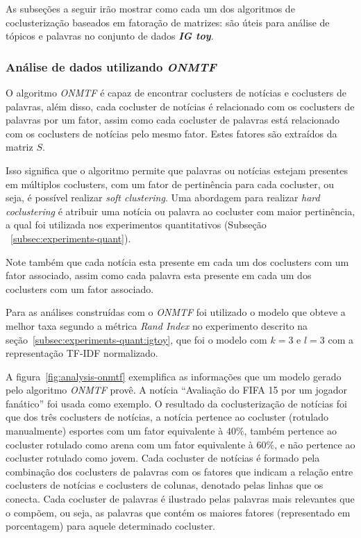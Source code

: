 \documentclass[
    12pt,                %
    oneside,            %
    a4paper,            %
    english,            %
    brazil                %
    ]{abntex2ppgsi}
\begin{document}
As subseções a seguir irão mostrar como cada um dos algoritmos de coclusterização baseados em fatoração de matrizes:
são úteis para análise de tópicos e palavras no conjunto de dados \textit{\textbf{IG toy}}.

\subsubsection{Análise de dados utilizando \textit{ONMTF}}

O algoritmo \textit{ONMTF} é capaz de encontrar coclusters de notícias e coclusters de palavras, além disso, cada cocluster de notícias é relacionado com os coclusters de palavras por um fator, assim como cada cocluster de palavras está relacionado com os coclusters de notícias pelo mesmo fator.
Estes fatores são extraídos da matriz $S$.

Isso significa que o algoritmo permite que palavras ou notícias estejam presentes em múltiplos coclusters, com um fator de pertinência para cada cocluster, ou seja, é possível realizar \textit{soft clustering}.\tabularnewline
Uma abordagem para realizar \textit{hard coclustering} é atribuir uma notícia ou palavra ao cocluster com maior pertinência, a qual foi utilizada nos experimentos quantitativos (Subseção ~\ref{subsec:experiments-quant}).

Note também que cada notícia esta presente em cada um dos coclusters com um fator associado, assim como cada palavra esta presente em cada um dos coclusters com um fator associado.

Para as análises construídas com o \textit{ONMTF} foi utilizado o modelo que obteve a melhor taxa segundo a métrica \textit{Rand Index} no experimento descrito na seção~\ref{subsec:experiments-quant:igtoy}, que foi o modelo com $k = 3$ e $l = 3$ com a representação TF-IDF normalizado.

A figura~\ref{fig:analysis-onmtf} exemplifica as informações que um modelo gerado pelo algoritmo \textit{ONMTF} provê.
A notícia ``Avaliação do FIFA 15 por um jogador fanático'' foi usada como exemplo.
O resultado da coclusterização de notícias foi que dos três coclusters de notícias, a notícia pertence ao cocluster (rotulado manualmente) esportes com um fator equivalente à $40\%$, também pertence ao cocluster rotulado como arena com um fator equivalente à $60\%$, e não pertence ao cocluster rotulado como jovem.
Cada cocluster de notícias é formado pela combinação dos coclusters de palavras com os fatores que indicam a relação entre coclusters de notícias e coclusters de colunas, denotado pelas linhas que os conecta.
Cada cocluster de palavras é ilustrado pelas palavras mais relevantes que o compõem, ou seja, as palavras que contém os maiores fatores (representado em porcentagem) para aquele determinado cocluster.
\end{document}
